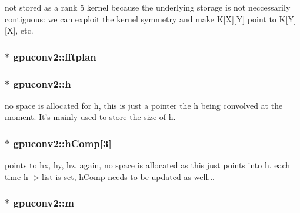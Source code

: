 not stored as a rank 5 kernel because the underlying storage is not neccessarily contiguous: we can exploit the kernel symmetry and make K\mbox{[}X\mbox{]}\mbox{[}Y\mbox{]} point to K\mbox{[}Y\mbox{]}\mbox{[}X\mbox{]}, etc. 

\hypertarget{structgpuconv2_adcd4ad6d8d98a95c99e698415a3cc058}{
\subsubsection[{fftplan}]{$\ast$ {\bf gpuconv2::fftplan}}}
\label{structgpuconv2_adcd4ad6d8d98a95c99e698415a3cc058}
\hypertarget{structgpuconv2_ae55b0700d3d86df36914b511fcaa25a0}{
\subsubsection[{h}]{$\ast$ {\bf gpuconv2::h}}}
\label{structgpuconv2_ae55b0700d3d86df36914b511fcaa25a0}


no space is allocated for h, this is just a pointer the h being convolved at the moment. It's mainly used to store the size of h. 

\hypertarget{structgpuconv2_a49eb6e78bd054b216c5d88a960eecf77}{
\subsubsection[{hComp}]{$\ast$ {\bf gpuconv2::hComp}\mbox{[}3\mbox{]}}}
\label{structgpuconv2_a49eb6e78bd054b216c5d88a960eecf77}


points to hx, hy, hz. again, no space is allocated as this just points into h. each time h-\/$>$list is set, hComp needs to be updated as well... 

\hypertarget{structgpuconv2_a1dcf396307b4b1787d139c2f7707a267}{
\subsubsection[{m}]{$\ast$ {\bf gpuconv2::m}}}
\label{structgpuconv2_a1dcf396307b4b1787d139c2f7707a267}


